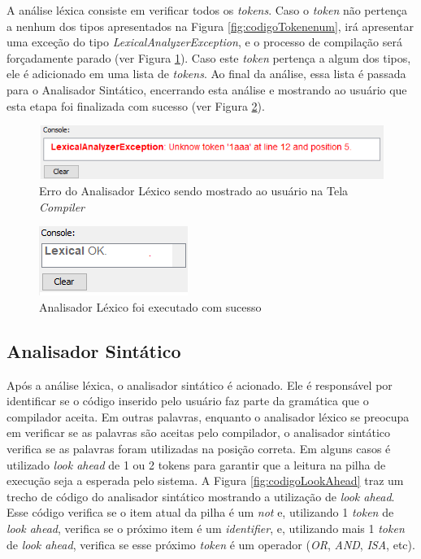 \documentclass{bcc}
\begin{document}
A análise léxica consiste em verificar todos os \textit{tokens}. Caso o \textit{token} não pertença a nenhum dos tipos apresentados na Figura \ref{fig:codigoTokenenum}, irá apresentar uma exceção do tipo \textit{LexicalAnalyzerException}, e o processo de compilação será forçadamente parado (ver Figura \ref{fig:codigoErroLexico}). Caso este \textit{token} pertença a algum dos tipos, ele é adicionado em uma lista de \textit{tokens}. Ao final da análise, essa lista é passada para o Analisador Sintático, encerrando esta análise e mostrando ao usuário que esta etapa foi finalizada com sucesso (ver Figura \ref{fig:codigoSucessoLexico}).

\begin{figure}[H]
\centering
\includegraphics[width=.8\textwidth]{Figuras/codigo_erro_lexico.png}
\caption{Erro do Analisador Léxico sendo mostrado ao usuário na Tela \textit{Compiler}}
\label{fig:codigoErroLexico}
\end{figure}

\begin{figure}[H]
\centering
\includegraphics[width=.3\textwidth]{Figuras/codigo_sucesso_lexico.png}
\caption{Analisador Léxico foi executado com sucesso}
\label{fig:codigoSucessoLexico}
\end{figure}

\subsection{Analisador Sintático}

Após a análise léxica, o analisador sintático é acionado. Ele é responsável por identificar se o código inserido pelo usuário faz parte da gramática que o compilador aceita. Em outras palavras, enquanto o analisador léxico se preocupa em verificar se as palavras são aceitas pelo compilador, o analisador sintático verifica se as palavras foram utilizadas na posição correta. Em alguns casos é utilizado \textit{look ahead} de 1 ou 2 tokens para garantir que a leitura na pilha de execução seja a esperada pelo sistema. A Figura \ref{fig:codigoLookAhead} traz um trecho de código do analisador sintático mostrando a utilização de \textit{look ahead}. Esse código verifica se o item atual da pilha é um \textit{not} e, utilizando 1 \textit{token} de \textit{look ahead}, verifica se o próximo item é um \textit{identifier}, e, utilizando mais 1 \textit{token} de \textit{look ahead}, verifica se esse próximo \textit{token} é um operador (\textit{OR}, \textit{AND}, \textit{ISA}, etc).
 
\end{document}
